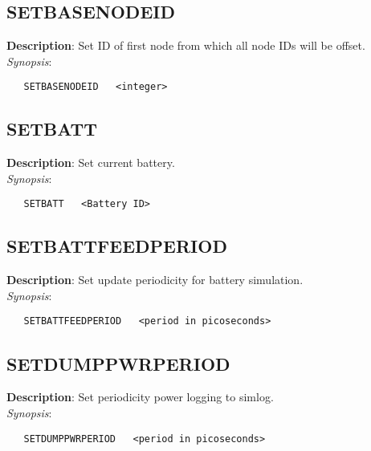 \subsection{\bf SETBASENODEID}
\label{manpages:SETBASENODEID}
\label{manpages:setbasenodeid}
\vspace{-0.2in}
{\bf Description}: 	Set ID of first node from which all node IDs will be offset.\\[1.5ex]
{\em Synopsis}:
\vspace{-0.2in}
\scriptsize
\begin{verbatim}
   SETBASENODEID   <integer>	
\end{verbatim}
\normalsize
\vspace{-0.2in}


\subsection{\bf SETBATT}
\label{manpages:SETBATT}
\label{manpages:setbatt}
\vspace{-0.2in}
{\bf Description}: 	Set current battery.\\[1.5ex]
{\em Synopsis}:
\vspace{-0.2in}
\scriptsize
\begin{verbatim}
   SETBATT   <Battery ID>					
\end{verbatim}
\normalsize
\vspace{-0.2in}


\subsection{\bf SETBATTFEEDPERIOD}
\label{manpages:SETBATTFEEDPERIOD}
\label{manpages:setbattfeedperiod}
\vspace{-0.2in}
{\bf Description}: 	Set update periodicity for battery simulation.\\[1.5ex]
{\em Synopsis}:
\vspace{-0.2in}
\scriptsize
\begin{verbatim}
   SETBATTFEEDPERIOD   <period in picoseconds> 
\end{verbatim}
\normalsize
\vspace{-0.2in}


\subsection{\bf SETDUMPPWRPERIOD}
\label{manpages:SETDUMPPWRPERIOD}
\label{manpages:setdumppwrperiod}
\vspace{-0.2in}
{\bf Description}: 	Set periodicity power logging to simlog.\\[1.5ex]
{\em Synopsis}:
\vspace{-0.2in}
\scriptsize
\begin{verbatim}
   SETDUMPPWRPERIOD   <period in picoseconds> 	
\end{verbatim}
\normalsize
\vspace{-0.2in}


